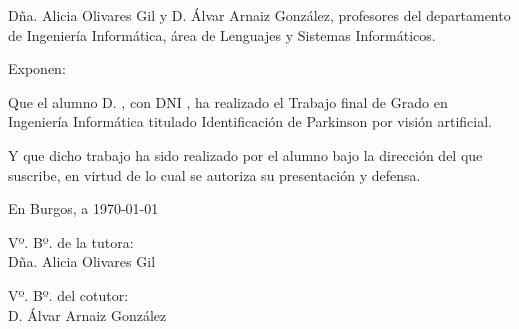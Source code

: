 

\newcommand{\capitulo}[1]{
    \stepcounter{chapter}
    \setcounter{section}{0}
    \setcounter{figure}{0}
    \setcounter{table}{0}
    \chapter*{\thechapter.\enskip #1}
    \addcontentsline{toc}{chapter}{\thechapter.\enskip #1}
    \markboth{#1}{#1}
}





\blankpage
\blankpage

\thispagestyle{empty}
\cabecera

\vfill

\noindent Dña. Alicia Olivares Gil y D. Álvar Arnaiz González, profesores
del departamento de Ingeniería Informática, área de Lenguajes y Sistemas
Informáticos.

\noindent Exponen:

\noindent Que el alumno D. \theauthor, con DNI \thedni, ha realizado el
Trabajo final de Grado en Ingeniería Informática titulado Identificación de
Parkinson por visión artificial.

\noindent Y que dicho trabajo ha sido realizado por el alumno bajo la
dirección del que suscribe, en virtud de lo cual se autoriza su presentación
y defensa.

\begin{center}
    En Burgos, a {\large \today}
\end{center}

\vfill\vfill\vfill

\begin{minipage}{0.45\textwidth}
    \begin{flushleft}
        Vº. Bº. de la tutora:\\[2cm]
        Dña. Alicia Olivares Gil
    \end{flushleft}
\end{minipage}
\hfill
\begin{minipage}{0.45\textwidth}
    \begin{flushleft}
        Vº. Bº. del cotutor:\\[2cm]
        D. Álvar Arnaiz González
    \end{flushleft}
\end{minipage}

\hfill
\vfill


